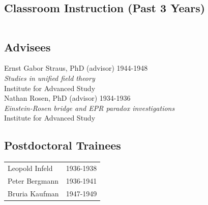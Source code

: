 \documentclass[martgin, line]{article}
\begin{document}
\subsection*{Classroom Instruction (Past 3 Years)}

\setlength{\extrarowheight}{.75em}
\begin{longtable}[l]{lp{4in}l}
                    \end{longtable}
\setlength{\extrarowheight}{0em}


\subsection*{Advisees}


Ernst Gabor Straus, PhD (advisor)
\hfill 1944-1948\\ 
\textit{Studies in unified field theory}\\
Institute for Advanced Study\\

Nathan Rosen, PhD (advisor)
\hfill 1934-1936\\ 
\textit{Einstein-Rosen bridge and EPR paradox investigations}\\
Institute for Advanced Study\\






\subsection*{Postdoctoral Trainees}

\setlength{\extrarowheight}{.25em}
\begin{tabular}{ll}   
Leopold Infeld&
1936-1938\\
Peter Bergmann&
1936-1941\\
Bruria Kaufman&
1947-1949\\
\end{tabular}
\setlength{\extrarowheight}{0em}
\end{document}
